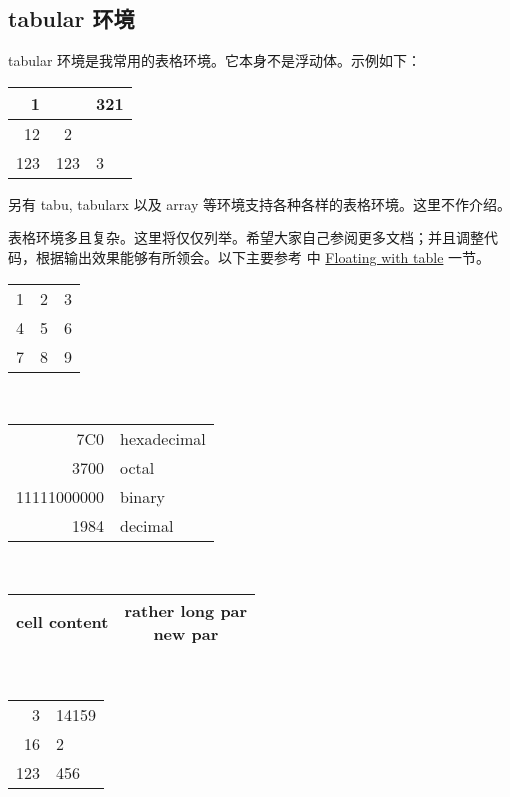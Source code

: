 \subsection{tabular 环境}
tabular 环境是我常用的表格环境。它本身不是浮动体。示例如下：
\begin{sidelst}
\begin{tabular}{|r|c|l|}
\cline{1-1} \cline{3-3}
1 & & 321 \\ \hline
12 & 2 \\ \hline
123 & 123 & 3 \\ \hline
\end{tabular}
\end{sidelst}
另有 tabu, tabularx 以及 array 等环境支持各种各样的表格环境。这里不作介绍。

表格环境多且复杂。这里将仅仅列举。希望大家自己参阅更多文档；并且调整代码，根据输出效果能够有所领会。以下主要参考 \cite{wiki:tables} 中 \href{https://en.wikibooks.org/wiki/LaTeX/Tables\#Floating\_with\_table}{Floating with table} 一节。
\begin{sidelst}
\centering     %
\begin{tabular}{r | l c}  %
1 & 2 & 3 \\              %
4 & 5 & 6 \\
7 & 8 & 9 \\ \hline       %
\end{tabular}
\\[1cm]
\begin{tabular}{|r|l|}    %
\hline
7C0 & hexadecimal \\
3700 & octal \\ \cline{2-2} %
11111000000 & binary \\
\hline \hline
1984 & decimal \\ \hline
\end{tabular}
\\[1cm]
\begin{tabular}{cc}
\hline %
cell content & \parbox[t]{2.cm}{rather long par\\new par}
\\ \hline
\end{tabular}
\\[1cm]
\begin{tabular}{r@{.}l} %
\hline
3   & 14159 \\
16  & 2     \\
123 & 456   \\ \hline
\end{tabular}
\end{sidelst}

